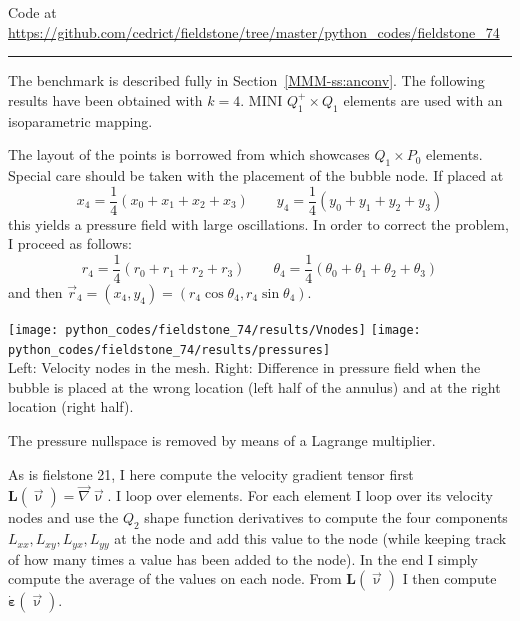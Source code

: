 


\begin{center}
Code at \url{https://github.com/cedrict/fieldstone/tree/master/python_codes/fieldstone_74}
\end{center}

\par\noindent\rule{\textwidth}{0.4pt}


The benchmark is described fully in Section~\ref{MMM-ss:anconv}. 
The following results have been obtained with $k=4$.
MINI $Q_1^+ \times Q_1$ elements are used with an isoparametric mapping. 

The layout of the points is borrowed from  which 
showcases $Q_1 \times P_0$ elements. 
Special care should be taken with the placement of the bubble node.  
If placed at 
\[
x_4 = \frac{1}{4}(x_0+x_1+x_2+x_3)
\qquad
y_4 = \frac{1}{4}(y_0+y_1+y_2+y_3)
\]
this yields a pressure field with large oscillations. In order to correct the 
problem, I proceed as follows:
\[
r_4 = \frac{1}{4}(r_0+r_1+r_2+r_3)
\qquad
\theta_4 = \frac{1}{4}(\theta_0+\theta_1+\theta_2+\theta_3)
\]
and then $\vec{r}_4=(x_4,y_4)=(r_4 \cos\theta_4,r_4 \sin\theta_4)$.

\begin{center}
\texttt{[image: python\_codes/fieldstone\_74/results/Vnodes]}
\texttt{[image: python\_codes/fieldstone\_74/results/pressures]}\\
{\captionfont Left: Velocity nodes in the mesh. Right: 
Difference in pressure field when the bubble is placed
at the wrong location (left half of the annulus) and at the right location (right half).}
\end{center}

The pressure nullspace is removed by means of a Lagrange multiplier.

As is fielstone 21, I here compute the velocity gradient tensor first ${\bm L}(\vec\upnu)=\vec\nabla\vec\upnu$.
I loop over elements. For each element I loop over its velocity nodes and use the $Q_2$ 
shape function derivatives to compute the four components $L_{xx},L_{xy},L_{yx},L_{yy}$ at 
the node and add this value to the node (while keeping track of how many times a value
has been added to the node). In the end I simply compute the average of the values
on each node. From ${\bm L}(\vec\upnu)$ I then compute $\dot{\bm \varepsilon}(\vec\upnu)$. 

